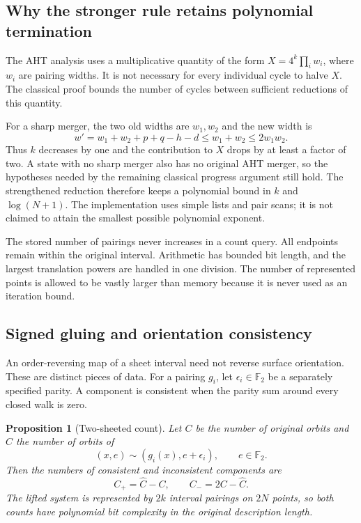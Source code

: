 \documentclass[11pt]{article}
\newtheorem{proposition}[theorem]{Proposition}
\theoremstyle{definition}
\newcommand{\F}{\mathbb F_2}
\begin{document}
\subsection{Why the stronger rule retains polynomial termination}

The AHT analysis uses a multiplicative quantity of the form
$X=4^k\prod_i w_i$, where $w_i$ are pairing widths. It is not necessary
for every individual cycle to halve $X$. The classical proof bounds the
number of cycles between sufficient reductions of this quantity.

For a sharp merger, the two old widths are $w_1,w_2$ and the new width is
\[
 w'=w_1+w_2+p+q-h-d\le w_1+w_2\le2w_1w_2.
\]
Thus $k$ decreases by one and the contribution to $X$ drops by at least
a factor of two. A state with no sharp merger also has no original AHT
merger, so the hypotheses needed by the remaining classical progress
argument still hold. The strengthened reduction therefore keeps a
polynomial bound in $k$ and $\log(N+1)$. The implementation uses simple
lists and pair scans; it is not claimed to attain the smallest possible
polynomial exponent.

The stored number of pairings never increases in a count query. All
endpoints remain within the original interval. Arithmetic has bounded
bit length, and the largest translation powers are handled in one division.
The number of represented points is allowed to be vastly larger than
memory because it is never used as an iteration bound.

\subsection{Signed gluing and orientation consistency}

An order-reversing map of a sheet interval need not reverse surface
orientation. These are distinct pieces of data. For a pairing $g_i$,
let $\epsilon_i\in\F$ be a separately specified parity. A component is
consistent when the parity sum around every closed walk is zero.

\begin{proposition}[Two-sheeted count]
\label{prop:signed}
Let $C$ be the number of original orbits and $\widehat C$ the number of
orbits of
\[
 (x,e)\sim(g_i(x),e+\epsilon_i),\qquad e\in\F.
\]
Then the numbers of consistent and inconsistent components are
\[
                    C_{+}=\widehat C-C,\qquad
                    C_{-}=2C-\widehat C.
\]
The lifted system is represented by $2k$ interval pairings on $2N$
points, so both counts have polynomial bit complexity in the original
description length.
\end{proposition}
\end{document}
